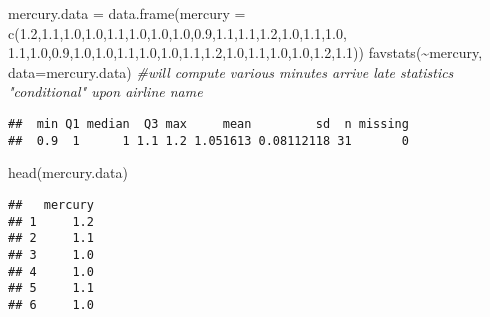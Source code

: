 \documentclass[
]{article}
\newenvironment{Shaded}{\begin{snugshade}}{\end{snugshade}}
\newcommand{\AttributeTok}[1]{\textcolor[rgb]{0.77,0.63,0.00}{#1}}
\newcommand{\CommentTok}[1]{\textcolor[rgb]{0.56,0.35,0.01}{\textit{#1}}}
\newcommand{\FloatTok}[1]{\textcolor[rgb]{0.00,0.00,0.81}{#1}}
\newcommand{\FunctionTok}[1]{\textcolor[rgb]{0.00,0.00,0.00}{#1}}
\newcommand{\NormalTok}[1]{#1}
\newcommand{\OtherTok}[1]{\textcolor[rgb]{0.56,0.35,0.01}{#1}}
\newcommand{\SpecialCharTok}[1]{\textcolor[rgb]{0.00,0.00,0.00}{#1}}
\begin{document}
\begin{Shaded}
\begin{Highlighting}[]
\NormalTok{mercury.data }\OtherTok{=} \FunctionTok{data.frame}\NormalTok{(}\AttributeTok{mercury =} \FunctionTok{c}\NormalTok{(}\FloatTok{1.2}\NormalTok{,}\FloatTok{1.1}\NormalTok{,}\FloatTok{1.0}\NormalTok{,}\FloatTok{1.0}\NormalTok{,}\FloatTok{1.1}\NormalTok{,}\FloatTok{1.0}\NormalTok{,}\FloatTok{1.0}\NormalTok{,}\FloatTok{1.0}\NormalTok{,}\FloatTok{0.9}\NormalTok{,}\FloatTok{1.1}\NormalTok{,}\FloatTok{1.1}\NormalTok{,}\FloatTok{1.2}\NormalTok{,}\FloatTok{1.0}\NormalTok{,}\FloatTok{1.1}\NormalTok{,}\FloatTok{1.0}\NormalTok{, }\FloatTok{1.1}\NormalTok{,}\FloatTok{1.0}\NormalTok{,}\FloatTok{0.9}\NormalTok{,}\FloatTok{1.0}\NormalTok{,}\FloatTok{1.0}\NormalTok{,}\FloatTok{1.1}\NormalTok{,}\FloatTok{1.0}\NormalTok{,}\FloatTok{1.0}\NormalTok{,}\FloatTok{1.1}\NormalTok{,}\FloatTok{1.2}\NormalTok{,}\FloatTok{1.0}\NormalTok{,}\FloatTok{1.1}\NormalTok{,}\FloatTok{1.0}\NormalTok{,}\FloatTok{1.0}\NormalTok{,}\FloatTok{1.2}\NormalTok{,}\FloatTok{1.1}\NormalTok{))}
\FunctionTok{favstats}\NormalTok{(}\SpecialCharTok{\textasciitilde{}}\NormalTok{mercury, }\AttributeTok{data=}\NormalTok{mercury.data) }\CommentTok{\#will compute various minutes arrive late statistics "conditional" upon airline name}
\end{Highlighting}
\end{Shaded}

\begin{verbatim}
##  min Q1 median  Q3 max     mean         sd  n missing
##  0.9  1      1 1.1 1.2 1.051613 0.08112118 31       0
\end{verbatim}

\begin{Shaded}
\begin{Highlighting}[]
\FunctionTok{head}\NormalTok{(mercury.data)}
\end{Highlighting}
\end{Shaded}

\begin{verbatim}
##   mercury
## 1     1.2
## 2     1.1
## 3     1.0
## 4     1.0
## 5     1.1
## 6     1.0
\end{verbatim}
\end{document}
